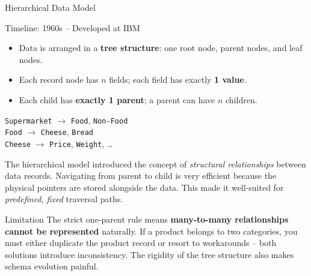 \begin{frame}{Hierarchical Data Model}
  \begin{block}{Timeline: 1960s -- Developed at IBM}
    \begin{itemize}
      \item Data is arranged in a \textbf{tree structure}: one root node,
            parent nodes, and leaf nodes.
      \item Each record node has $n$ fields; each field has exactly \textbf{1 value}.
      \item Each child has \textbf{exactly 1 parent}; a parent can have $n$ children.
    \end{itemize}
  \end{block}

  \begin{examples}{}
    \texttt{Supermarket} $\rightarrow$ \texttt{Food}, \texttt{Non-Food}\\
    \texttt{Food} $\rightarrow$ \texttt{Cheese}, \texttt{Bread}\\
    \texttt{Cheese} $\rightarrow$ \texttt{Price}, \texttt{Weight}, \ldots
  \end{examples}

  The hierarchical model introduced the concept of \emph{structural relationships}
  between data records.  Navigating from parent to child is very efficient because
  the physical pointers are stored alongside the data.  This made it well-suited
  for \emph{predefined, fixed} traversal paths.

  \begin{alertblock}{Limitation}
    The strict one-parent rule means \textbf{many-to-many relationships cannot be
    represented} naturally.  If a product belongs to two categories, you must
    either duplicate the product record or resort to workarounds -- both
    solutions introduce inconsistency.  The rigidity of the tree structure
    also makes schema evolution painful.
  \end{alertblock}
\end{frame}

